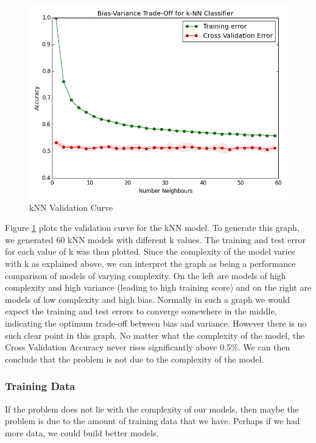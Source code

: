 \documentclass{report}
\begin{document}
\begin{figure}[H]
	\caption{kNN Validation Curve}
	\centerline{\includegraphics[width=\textwidth]{vis/prices-bias-variance.png}}
	\label{fig:knn-validation}
\end{figure}

Figure \ref{fig:knn-validation} plots the validation curve for the kNN model. To generate this graph, we generated 60 kNN models with different k values. The training and test error for each value of k was then plotted. Since the complexity of the model varies with k as explained above, we can interpret the graph as being a performance comparison of models of varying complexity. On the left are models of high complexity and high variance (leading to high training score) and on the right are models of low complexity and high bias. Normally in such a graph we would expect the training and test errors to converge somewhere in the middle, indicating the optimum trade-off between bias and variance. However there is no such clear point in this graph. No matter what the complexity of the model, the Cross Validation Accuracy never rises significantly above 0.5\%. We can then conclude that the problem is not due to the complexity of the model.

\subsubsection{Training Data}

If the problem does not lie with the complexity of our models, then maybe the problem is due to the amount of training data that we have. Perhaps if we had more data, we could build better models.
\end{document}
